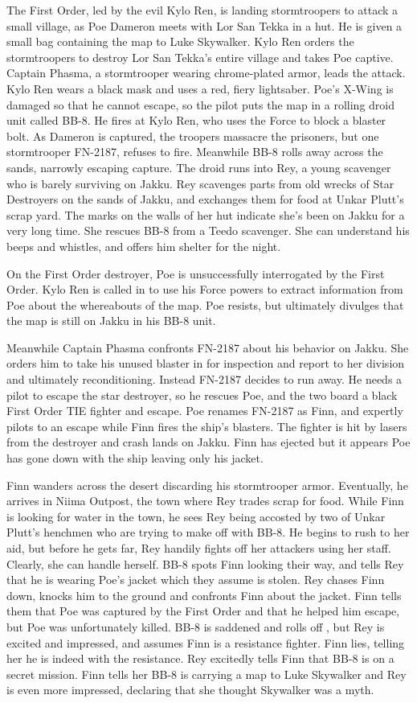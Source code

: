 \documentclass{article}
\begin{document}
The First Order, led by the evil Kylo Ren, is landing stormtroopers to attack a small village, as Poe Dameron meets with Lor San Tekka in a hut. He is given a small bag containing the map to Luke Skywalker. Kylo Ren orders the stormtroopers to destroy Lor San Tekka's entire village and takes Poe captive. Captain Phasma, a stormtrooper wearing chrome-plated armor, leads the attack. Kylo Ren wears a black mask and uses a red, fiery lightsaber. Poe's X-Wing is damaged so that he cannot escape, so the pilot puts the map in a rolling droid unit called BB-8. He fires at Kylo Ren, who uses the Force to block a blaster bolt. As Dameron is captured, the troopers massacre the prisoners, but one stormtrooper FN-2187, refuses to fire. Meanwhile BB-8 rolls away across the sands, narrowly escaping capture. The droid runs into Rey, a young scavenger who is barely surviving on Jakku. Rey scavenges parts from old wrecks of Star Destroyers on the sands of Jakku, and exchanges them for food at Unkar Plutt's scrap yard. The marks on the walls of her hut indicate she's been on Jakku for a very long time. She rescues BB-8 from a Teedo scavenger. She can understand his beeps and whistles, and offers him shelter for the night.

On the First Order destroyer, Poe is unsuccessfully interrogated by the First Order. Kylo Ren is called in to use his Force powers to extract information from Poe about the whereabouts of the map. Poe resists, but ultimately divulges that the map is still on Jakku in his BB-8 unit.

Meanwhile Captain Phasma confronts FN-2187 about his behavior on Jakku. She orders him to take his unused blaster in for inspection and report to her division and ultimately reconditioning. Instead FN-2187 decides to run away. He needs a pilot to escape the star destroyer, so he rescues Poe, and the two board a black First Order TIE fighter and escape. Poe renames FN-2187 as Finn, and expertly pilots to an escape while Finn fires the ship's blasters. The fighter is hit by lasers from the destroyer and crash lands on Jakku. Finn has ejected but it appears Poe has gone down with the ship leaving only his jacket.

Finn wanders across the desert discarding his stormtrooper armor. Eventually, he arrives in Niima Outpost, the town where Rey trades scrap for food. While Finn is looking for water in the town, he sees Rey being accosted by two of Unkar Plutt's henchmen who are trying to make off with BB-8. He begins to rush to her aid, but before he gets far, Rey handily fights off her attackers using her staff. Clearly, she can handle herself. BB-8 spots Finn looking their way, and tells Rey that he is wearing Poe's jacket which they assume is stolen. Rey chases Finn down, knocks him to the ground and confronts Finn about the jacket. Finn tells them that Poe was captured by the First Order and that he helped him escape, but Poe was unfortunately killed. BB-8 is saddened and rolls off , but Rey is excited and impressed, and assumes Finn is a resistance fighter. Finn lies, telling her he is indeed with the resistance. Rey excitedly tells Finn that BB-8 is on a secret mission. Finn tells her BB-8 is carrying a map to Luke Skywalker and Rey is even more impressed, declaring that she thought Skywalker was a myth.
\end{document}
